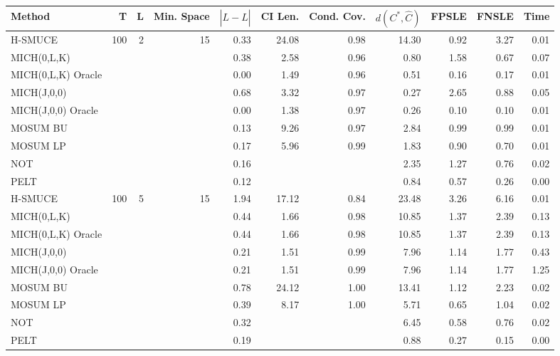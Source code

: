 
\begin{table} \label{tab:hsmuce-sim}
    \footnotesize
    \centering
    \begin{tabular}{l| r r r r r r r r r r}
        Method & T & L & Min. Space & $|L - \hat{L}|$ & CI Len. & Cond. Cov. & $d(C^*,\hat{C})$ & FPSLE & FNSLE & Time \\ \hline\hline 
        H-SMUCE & 100 & 2 & 15 & 0.33 & 24.08 & 0.98 & 14.30 & 0.92 & 3.27 & 0.01 \\
        MICH(0,L,K) &  &  &  & 0.38 & 2.58 & 0.96 & 0.80 & 1.58 & 0.67 & 0.07 \\
        MICH(0,L,K) Oracle &  &  &  & 0.00 & 1.49 & 0.96 & 0.51 & 0.16 & 0.17 & 0.01 \\
        MICH(J,0,0) &  &  &  & 0.68 & 3.32 & 0.97 & 0.27 & 2.65 & 0.88 & 0.05 \\
        MICH(J,0,0) Oracle &  &  &  & 0.00 & 1.38 & 0.97 & 0.26 & 0.10 & 0.10 & 0.01 \\
        MOSUM BU &  &  &  & 0.13 & 9.26 & 0.97 & 2.84 & 0.99 & 0.99 & 0.01 \\
        MOSUM LP &  &  &  & 0.17 & 5.96 & 0.99 & 1.83 & 0.90 & 0.70 & 0.01 \\
        NOT &  &  &  & 0.16 & &  & 2.35 & 1.27 & 0.76 & 0.02 \\
        PELT &  &  &  & 0.12 & &  & 0.84 & 0.57 & 0.26 & 0.00\\ \hline
        
        H-SMUCE & 100 & 5 & 15 & 1.94 & 17.12 & 0.84 & 23.48 & 3.26 & 6.16 & 0.01 \\
        MICH(0,L,K) &  &  &  & 0.44 & 1.66 & 0.98 & 10.85 & 1.37 & 2.39 & 0.13 \\
        MICH(0,L,K) Oracle &  &  &  & 0.44 & 1.66 & 0.98 & 10.85 & 1.37 & 2.39 & 0.13 \\
        MICH(J,0,0) &  &  &  & 0.21 & 1.51 & 0.99 & 7.96 & 1.14 & 1.77 & 0.43 \\
        MICH(J,0,0) Oracle &  &  &  & 0.21 & 1.51 & 0.99 & 7.96 & 1.14 & 1.77 & 1.25 \\
        MOSUM BU &  &  &  & 0.78 & 24.12 & 1.00 & 13.41 & 1.12 & 2.23 & 0.02 \\
        MOSUM LP &  &  &  & 0.39 & 8.17 & 1.00 & 5.71 & 0.65 & 1.04 & 0.02 \\
        NOT &  &  &  & 0.32 &  &  & 6.45 & 0.58 & 0.76 & 0.02 \\
        PELT &  &  &  & 0.19 &  &  & 0.88 & 0.27 & 0.15 & 0.00\\ \hline


\end{tabular}
\end{table}
